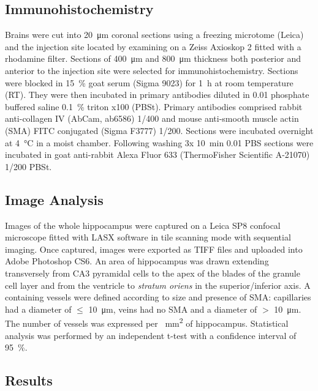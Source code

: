\documentclass{frontiersFPHY} %
\newcommand{\Ab}{A\textbeta\xspace}
\begin{document}
\subsection{Immunohistochemistry}

Brains were cut into \SI{20}{\micro\metre} coronal sections using a freezing microtome (Leica) and the injection site located by examining on a Zeiss Axioskop 2 fitted with a rhodamine filter. Sections of \SI{400}{\micro\metre} and \SI{800}{\micro\metre} thickness both posterior and anterior to the injection site were selected for immunohistochemistry. Sections were blocked in \SI{15}{\percent} goat serum (Sigma 9023) for \SI{1}{\hour} at room temperature (RT). They were then incubated in primary antibodies diluted in \SI{0.01}{\Molar} phosphate buffered saline \SI{0.1}{\percent} triton x100 (PBSt). Primary antibodies comprised rabbit anti-collagen IV (AbCam, ab6586) 1/400 and mouse anti-smooth muscle actin (SMA) FITC conjugated (Sigma F3777) 1/200. Sections were incubated overnight at \SI{4}{\celsius} in a moist chamber. Following washing 3x \SI{10}{\minute} \SI{0.01}{\Molar} PBS sections were incubated in goat anti-rabbit Alexa Fluor 633 (ThermoFisher Scientific A-21070) 1/200 PBSt.

\subsection{Image Analysis}

Images of the whole hippocampus were captured on a Leica SP8 confocal microscope fitted with LASX software in tile scanning mode with sequential imaging. Once captured, images were exported as TIFF files and uploaded into Adobe Photoshop CS6. An area of hippocampus was drawn extending transversely from CA3 pyramidal cells to the apex of the blades of the granule cell layer and from the ventricle to \textit{stratum oriens} in the superior/inferior axis. \Ab containing vessels were defined according to size and presence of SMA: capillaries had a diameter of $\leq$ \SI{10}{\micro\metre}, veins had no SMA and a diameter of $>$ \SI{10}{\micro\metre}. The number of vessels was expressed per \SI{}{\square\milli\metre} of hippocampus. Statistical analysis was performed by an independent t-test with a confidence interval of \SI{95}{\percent}.

\subsection{Results}
\end{document}
